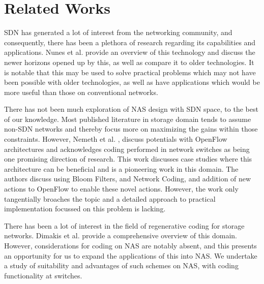\section{Related Works}

SDN has generated a lot of interest from the networking community, and consequently, there has been a plethora of research regarding its capabilities and applications. Nunes et al. \cite{nunes2014survey} provide an overview of this technology and discuss the newer horizons opened up by this, as well as compare it to older technologies. It is notable that this may be used to solve practical problems which may not have been possible with older technologies, as well as have applications which would be more useful than those on conventional networks. 

There has not been much exploration of NAS design with SDN space, to the best of our knowledge. Most published literature in storage domain tends to assume non-SDN networks and thereby focus more on maximizing the gains within those constraints. However, Nemeth et al. \cite{nemeth2012towards}, discuss potentials with OpenFlow architectures and acknowledges coding performed in network switches as being one promising direction of research. This work discusses case studies where this architecture can be beneficial and is a pioneering work in this domain. The authors discuss using Bloom Filters, and Network Coding, and addition of new actions to OpenFlow to enable these novel actions. However, the work only tangentially broaches the topic and a detailed approach to practical implementation focussed on this problem is lacking.

There has been a lot of interest in the field of regenerative coding for storage networks. Dimakis et al. \cite{dimakis2011survey} provide a comprehensive overview of this domain. However, considerations for coding on NAS are notably absent, and this presents an opportunity for us to expand the applications of this into NAS. We undertake a study of suitability and advantages of such schemes on NAS, with coding functionality at switches.   



